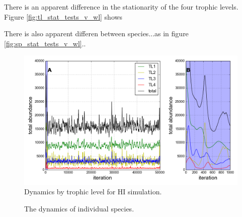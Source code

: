 There is an apparent difference in the stationarity of the four trophic levels. Figure \ref{fig:tl_stat_tests_v_wl} shows 

There is also apparent differen between species...as in figure \ref{fig:sp_stat_tests_v_wl}..

\begin{figure}[hb]
	\centering
	\includegraphics[width=0.8\linewidth]{"./chapters/chapter04b/figures/hi_trophic_dynamics"}
     \caption{Dynamics by trophic level for HI simulation.} 
     \label{fig:hi_trophic_dynamics}   
\end{figure}


\begin{figure}[hp]
	\centering
        \caption{The dynamics of individual species.}    
    \label{fig:dynamics_by_species}
\end{figure}

